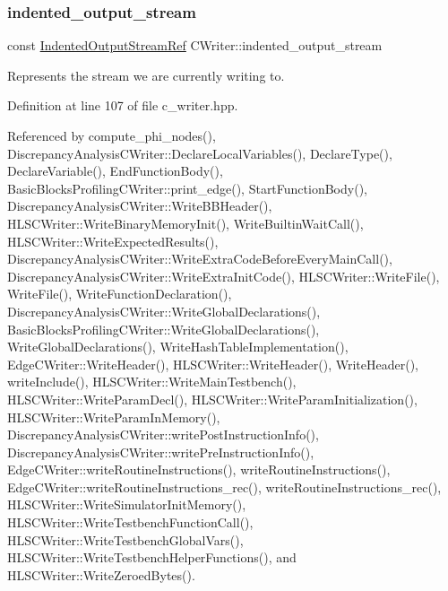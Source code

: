 \mbox{\label{classCWriter_ac6d016436e065c31dd5152a7cc30e507}} 
\subsubsection{\texorpdfstring{indented\+\_\+output\+\_\+stream}{indented\_output\_stream}}
{\footnotesize\ttfamily const \hyperlink{indented__output__stream_8hpp_ab32278e11151ef292759c88e99b77feb}{Indented\+Output\+Stream\+Ref} C\+Writer\+::indented\+\_\+output\+\_\+stream\hspace{0.3cm}{\ttfamily [protected]}}



Represents the stream we are currently writing to. 



Definition at line 107 of file c\+\_\+writer.\+hpp.



Referenced by compute\+\_\+phi\+\_\+nodes(), Discrepancy\+Analysis\+C\+Writer\+::\+Declare\+Local\+Variables(), Declare\+Type(), Declare\+Variable(), End\+Function\+Body(), Basic\+Blocks\+Profiling\+C\+Writer\+::print\+\_\+edge(), Start\+Function\+Body(), Discrepancy\+Analysis\+C\+Writer\+::\+Write\+B\+B\+Header(), H\+L\+S\+C\+Writer\+::\+Write\+Binary\+Memory\+Init(), Write\+Builtin\+Wait\+Call(), H\+L\+S\+C\+Writer\+::\+Write\+Expected\+Results(), Discrepancy\+Analysis\+C\+Writer\+::\+Write\+Extra\+Code\+Before\+Every\+Main\+Call(), Discrepancy\+Analysis\+C\+Writer\+::\+Write\+Extra\+Init\+Code(), H\+L\+S\+C\+Writer\+::\+Write\+File(), Write\+File(), Write\+Function\+Declaration(), Discrepancy\+Analysis\+C\+Writer\+::\+Write\+Global\+Declarations(), Basic\+Blocks\+Profiling\+C\+Writer\+::\+Write\+Global\+Declarations(), Write\+Global\+Declarations(), Write\+Hash\+Table\+Implementation(), Edge\+C\+Writer\+::\+Write\+Header(), H\+L\+S\+C\+Writer\+::\+Write\+Header(), Write\+Header(), write\+Include(), H\+L\+S\+C\+Writer\+::\+Write\+Main\+Testbench(), H\+L\+S\+C\+Writer\+::\+Write\+Param\+Decl(), H\+L\+S\+C\+Writer\+::\+Write\+Param\+Initialization(), H\+L\+S\+C\+Writer\+::\+Write\+Param\+In\+Memory(), Discrepancy\+Analysis\+C\+Writer\+::write\+Post\+Instruction\+Info(), Discrepancy\+Analysis\+C\+Writer\+::write\+Pre\+Instruction\+Info(), Edge\+C\+Writer\+::write\+Routine\+Instructions(), write\+Routine\+Instructions(), Edge\+C\+Writer\+::write\+Routine\+Instructions\+\_\+rec(), write\+Routine\+Instructions\+\_\+rec(), H\+L\+S\+C\+Writer\+::\+Write\+Simulator\+Init\+Memory(), H\+L\+S\+C\+Writer\+::\+Write\+Testbench\+Function\+Call(), H\+L\+S\+C\+Writer\+::\+Write\+Testbench\+Global\+Vars(), H\+L\+S\+C\+Writer\+::\+Write\+Testbench\+Helper\+Functions(), and H\+L\+S\+C\+Writer\+::\+Write\+Zeroed\+Bytes().

